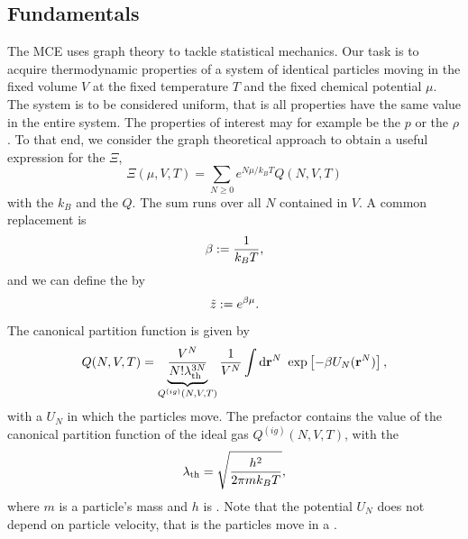 \documentclass[8.5pt,twoside,twocolumn]{article}
\newcommand\di{\te{d}}
\newcommand\dr{\di\r}
\renewcommand\r{\bo r}
\theoremstyle{standard}
\begin{document}
\subsection{Fundamentals}
The MCE uses graph theory to tackle statistical mechanics. Our task is to acquire thermodynamic
properties of a system of identical particles moving in the fixed volume $V$ at the fixed temperature $T$
and the fixed chemical potential $\mu$. The system is to be considered uniform, that is all properties 
have the same value in the entire system.
 The properties of interest may for example be the  $p$
or the  $\rho$. To that end, we consider the graph
theoretical approach to obtain a useful expression for the  $\Xi$,
\begin{equation}
\Xi(\mu,V,T)=\sum_{N\ge0} e^{N \mu/k_B T} Q(N,V,T)
\label{GrandCanonical}
\end{equation}
with %
the  $k_B$
and the  $Q$. The sum runs over all  $N$ contained in $V$.
A common replacement is
\begin{equation}
\beta:=\frac 1 {k_B T},
\end{equation}
and we can define the  by
\begin{equation}
\tilde z:=e^{\beta \mu}.
\label{fuga.1}
\end{equation}
The canonical partition function is given by
\begin{equation}
 \begin{aligned}
 Q(N,V,T)=\underbrace{\frac {V^N}{N!\la_\te{th}^{3N}}}_{Q^{(ig)}(N,V,T)} \frac 1 {V^N} \int \dr^N\ \exp\lt[-\be U_N(\r^N)\rt],
 \end{aligned}
\label{QNVT}
\end{equation}
with a  $U_N$ in which the particles move. The prefactor contains the value
of the canonical partition function of the ideal gas $Q^{(ig)}(N,V,T)$, with the 
\begin{equation}
\lambda_\text{th}=\sqrt{\frac {h^2} {2\pi mk_BT}},
\end{equation}
where $m$ is a particle's mass and $h$ is . Note that the potential $U_N$ does
not depend on particle velocity, that is the particles move in a . 
\end{document}
